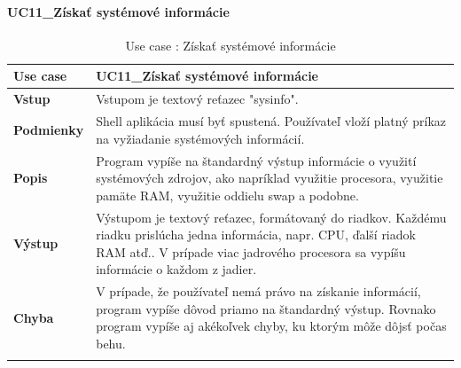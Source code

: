 \paragraph{UC11\_Získať systémové informácie}
\begin{center}
	\begin{longtable}{|p{2.5cm}|p{12.2cm}|}
		
			\hline
			\textbf{Use case} & UC11\_Získať systémové informácie \\ 
			\hline
			\textbf{Vstup} & Vstupom je textový reťazec "sysinfo".\\
			\hline
			\textbf{Podmienky} & Shell aplikácia musí byť spustená. Používateľ vloží platný príkaz na vyžiadanie systémových informácií. \\ 
			\hline
			\textbf{Popis} & Program vypíše na štandardný výstup informácie o využití systémových zdrojov,  ako napríklad využitie procesora, využitie pamäte RAM, využitie oddielu swap a podobne.\\ 
			\hline
					
			\textbf{Výstup} & Výstupom je textový reťazec, formátovaný do riadkov. Každému riadku prislúcha jedna informácia, napr. CPU, ďalší riadok RAM atď.. V prípade viac jadrového procesora sa vypíšu informácie o každom z jadier.  \\
			\hline
			\textbf{Chyba} & V prípade, že používateľ nemá právo na získanie informácií, program vypíše dôvod priamo na štandardný výstup. Rovnako program vypíše aj akékoľvek chyby, ku ktorým môže dôjsť počas behu.\\
			\hline
		\caption{Use case : Získať systémové informácie}
		\label{table:1}
		
	\end{longtable}
\end{center}

